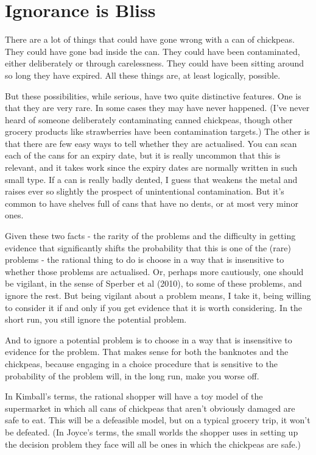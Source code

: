 \documentclass[
  12pt,
]{article}
\begin{document}
\hypertarget{ignorancebliss}{%
\section{Ignorance is Bliss}\label{ignorancebliss}}

There are a lot of things that could have gone wrong with a can of chickpeas. They could have gone bad inside the can. They could have been contaminated, either deliberately or through carelessness. They could have been sitting around so long they have expired. All these things are, at least logically, possible.

But these possibilities, while serious, have two quite distinctive features. One is that they are very rare. In some cases they may have never happened. (I've never heard of someone deliberately contaminating canned chickpeas, though other grocery products like strawberries have been contamination targets.) The other is that there are few easy ways to tell whether they are actualised. You can scan each of the cans for an expiry date, but it is really uncommon that this is relevant, and it takes work since the expiry dates are normally written in such small type. If a can is really badly dented, I guess that weakens the metal and raises ever so slightly the prospect of unintentional contamination. But it's common to have shelves full of cans that have no dents, or at most very minor ones.

Given these two facts - the rarity of the problems and the difficulty in getting evidence that significantly shifts the probability that this is one of the (rare) problems - the rational thing to do is choose in a way that is insensitive to whether those problems are actualised. Or, perhaps more cautiously, one should be vigilant, in the sense of Sperber et al (2010), to some of these problems, and ignore the rest. But being vigilant about a problem means, I take it, being willing to consider it if and only if you get evidence that it is worth considering. In the short run, you still ignore the potential problem.

And to ignore a potential problem is to choose in a way that is insensitive to evidence for the problem. That makes sense for both the banknotes and the chickpeas, because engaging in a choice procedure that is sensitive to the probability of the problem will, in the long run, make you worse off.

In Kimball's terms, the rational shopper will have a toy model of the supermarket in which all cans of chickpeas that aren't obviously damaged are safe to eat. This will be a defeasible model, but on a typical grocery trip, it won't be defeated. (In Joyce's terms, the small worlds the shopper uses in setting up the decision problem they face will all be ones in which the chickpeas are safe.)
\end{document}
